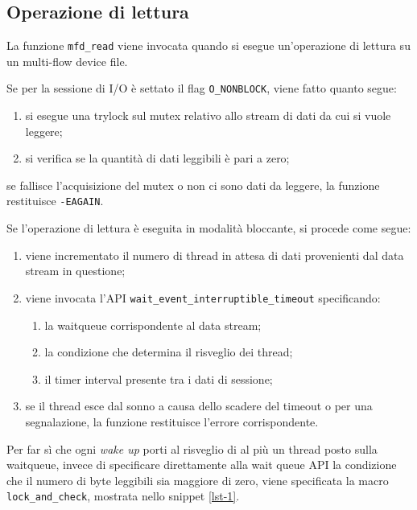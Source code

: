 \documentclass{article}
\begin{document}
\subsection{Operazione di lettura}
La funzione \texttt{mfd\_read} viene invocata quando si esegue un'operazione di lettura su un multi-flow device file.

Se per la sessione di I/O è settato il flag \texttt{O\_NONBLOCK}, viene fatto quanto segue:
\begin{enumerate}
\item si esegue una trylock sul mutex relativo allo stream di dati da cui si vuole leggere;
\item si verifica se la quantità di dati leggibili è pari a zero;
\end{enumerate}
se fallisce l'acquisizione del mutex o non ci sono dati da leggere, la funzione restituisce \texttt{-EAGAIN}.

Se l'operazione di lettura è eseguita in modalità bloccante, si procede come segue:
\begin{enumerate}
\item viene incrementato il numero di thread in attesa di dati provenienti dal data stream in questione;
\item viene invocata l'API \texttt{wait\_event\_interruptible\_timeout} specificando:
\begin{enumerate}
\item la waitqueue corrispondente al data stream;
\item la condizione che determina il risveglio dei thread;
\item il timer interval presente tra i dati di sessione;
\end{enumerate}
\item se il thread esce dal sonno a causa dello scadere del timeout o per una segnalazione, la funzione restituisce l'errore corrispondente.
\end{enumerate}
Per far sì che ogni \textsl{wake up} porti al risveglio di al più un thread posto sulla waitqueue, invece di specificare direttamente alla wait queue API la condizione che il numero di byte leggibili sia maggiore di zero, viene specificata la macro \texttt{lock\_and\_check}, mostrata nello snippet \ref{lst-1}.
\end{document}
